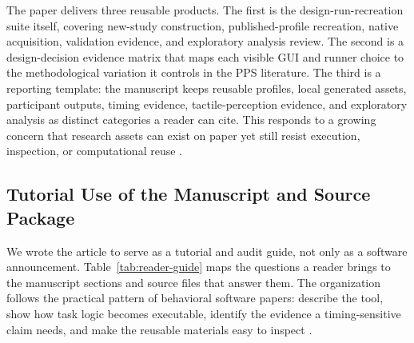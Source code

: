 \documentclass[pdflatex,sn-apa]{sn-jnl}
\begin{document}
The paper delivers three reusable products. The first is the design-run-recreation suite itself, covering new-study construction, published-profile recreation, native acquisition, validation evidence, and exploratory analysis review. The second is a design-decision evidence matrix that maps each visible GUI and runner choice to the methodological variation it controls in the PPS literature. The third is a reporting template: the manuscript keeps reusable profiles, local generated assets, participant outputs, timing evidence, tactile-perception evidence, and exploratory analysis as distinct categories a reader can cite. This responds to a growing concern that research assets can exist on paper yet still resist execution, inspection, or computational reuse \citep{Ellis2024}.

\subsection{Tutorial Use of the Manuscript and Source Package}

We wrote the article to serve as a tutorial and audit guide, not only as a software announcement. Table~\ref{tab:reader-guide} maps the questions a reader brings to the manuscript sections and source files that answer them. The organization follows the practical pattern of behavioral software papers: describe the tool, show how task logic becomes executable, identify the evidence a timing-sensitive claim needs, and make the reusable materials easy to inspect \citep{AnwylIrvine2018,Peirce2019,Akam2022,DeLeeuw2022}.
\end{document}
